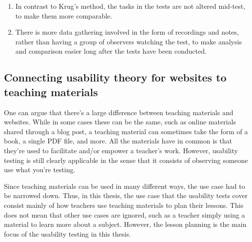 \begin{enumerate}
	\item In contrast to Krug's method, the tasks in the tests are not altered mid-test, to make them more comparable.
	\item There is more data gathering involved in the form of recordings and notes, rather than having a group of observers watching the test, to make analysis and comparison easier long after the tests have been conducted.
\end{enumerate}

\subsection{Connecting usability theory for websites to teaching materials}

One can argue that there's a large difference between teaching materials and websites. While in some cases these can be the same, such as online materials shared through a blog post, a teaching material can sometimes take the form of a book, a single PDF file, and more. All the materials have in common is that they're used to facilitate and/or empower a teacher's work. However, usability testing is still clearly applicable in the sense that it consists of observing someone use what you're testing.

Since teaching materials can be used in many different ways, the use case had to be narrowed down. Thus, in this thesis, the use case that the usability tests cover consist mainly of how teachers use teaching materials to plan their lessons. This does not mean that other use cases are ignored, such as a teacher simply using a material to learn more about a subject. However, the lesson planning is the main focus of the usability testing in this thesis.


